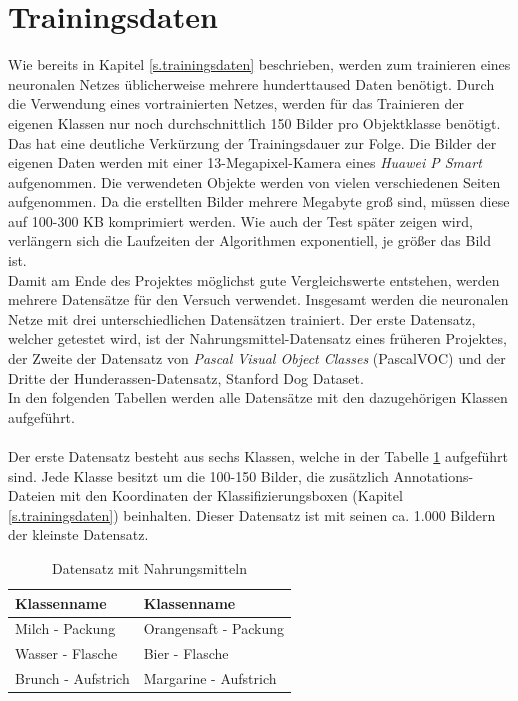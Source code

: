   \section{Trainingsdaten}\label{s.tdaten}
Wie bereits in Kapitel \ref{s.trainingsdaten} beschrieben, werden zum trainieren eines neuronalen Netzes üblicherweise mehrere hunderttaused Daten benötigt. Durch die Verwendung eines vortrainierten Netzes, werden für das Trainieren der eigenen Klassen nur noch durchschnittlich 150 Bilder pro Objektklasse benötigt. Das hat eine deutliche Verkürzung der Trainingsdauer zur Folge. Die Bilder der eigenen Daten werden mit einer 13-Megapixel-Kamera eines \textit{Huawei P Smart} aufgenommen. Die verwendeten Objekte werden von vielen verschiedenen Seiten aufgenommen. Da die erstellten Bilder mehrere Megabyte groß sind, müssen diese auf 100-300 KB komprimiert werden. Wie auch der Test später zeigen wird, verlängern sich die Laufzeiten der Algorithmen exponentiell, je größer das Bild ist.\\
Damit am Ende des Projektes möglichst gute Vergleichswerte entstehen, werden mehrere Datensätze für den Versuch verwendet. Insgesamt werden die neuronalen Netze mit drei unterschiedlichen Datensätzen trainiert. Der erste Datensatz, welcher getestet wird, ist der Nahrungsmittel-Datensatz eines früheren Projektes, der Zweite der Datensatz von \textit{Pascal Visual Object Classes} (PascalVOC) und der Dritte der Hunderassen-Datensatz, Stanford Dog Dataset.\\
In den folgenden Tabellen werden alle Datensätze mit den dazugehörigen Klassen aufgeführt.\\\\
Der erste Datensatz besteht aus sechs Klassen, welche in der Tabelle \ref{tab:nahrungsmittel} aufgeführt sind. Jede Klasse besitzt um die 100-150 Bilder, die zusätzlich Annotations-Dateien mit den Koordinaten der Klassifizierungsboxen (Kapitel \ref{s.trainingsdaten}) beinhalten. Dieser Datensatz ist mit seinen ca. 1.000 Bildern der kleinste Datensatz. 
\begin{table}
[h]
\caption{Datensatz mit Nahrungsmitteln}
\centering
\begin{tabular}{|l|l|}
\hline
Klassenname & Klassenname\\
\hline
Milch - Packung & Orangensaft - Packung\\
Wasser - Flasche & Bier - Flasche\\
Brunch - Aufstrich & Margarine - Aufstrich\\
\hline
\end{tabular}
\label{tab:nahrungsmittel}
\end{table}
